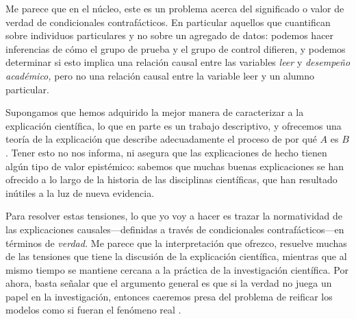 Me parece que en el núcleo, este es un problema acerca del significado o valor de
verdad de condicionales contrafácticos. En particular
aquellos que cuantifican sobre individuos particulares y no
sobre un agregado de datos:
podemos hacer inferencias de cómo el grupo de prueba y el
grupo de control difieren, y podemos determinar si esto
implica una relación causal entre las variables \emph{leer}
y \emph{desempeño académico,} pero no una relación causal
entre la variable leer y un alumno particular.



Supongamos que hemos adquirido la
mejor manera de caracterizar a la explicación científica, lo
que en parte es un trabajo descriptivo, y ofrecemos una 
teoría de la explicación que describe adecuadamente el
proceso de  por qué $ A $
es $ B $. Tener esto no nos informa, ni asegura que las
explicaciones de hecho tienen algún tipo de valor
epistémico: sabemos que muchas buenas explicaciones
se han ofrecido a lo largo de la historia de las disciplinas
científicas, que han resultado inútiles a la luz de nueva
evidencia. 

Para resolver estas tensiones, lo que yo voy a hacer es
trazar la normatividad de las explicaciones
causales---definidas a través de condicionales contrafácticos---en términos de
\emph{verdad.} Me parece que la interpretación que ofrezco,
resuelve muchas de las tensiones que tiene la discusión de
la explicación científica, mientras que al mismo tiempo se
mantiene cercana a la práctica de la investigación
científica.  Por ahora, basta señalar que el argumento
general es que si la verdad no juega un
papel en la investigación, entonces caeremos presa del
problema de reificar los
modelos como si fueran el fenómeno real
\parencite{Winther2014, Lewontin2017, lewontin2006, Lewontin2021}. 



